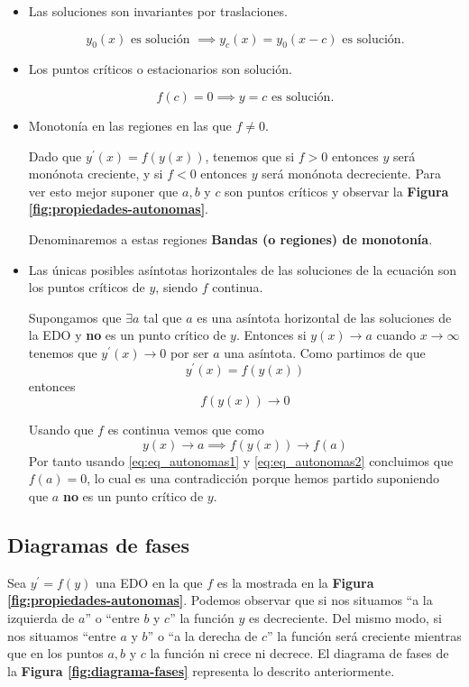 \documentclass{mathnotes}
\begin{document}

\begin{itemize}
\item Las soluciones son invariantes por traslaciones.

$$y_0(x) \text{ es solución } \implies y_c(x) = y_0(x-c) \text{ es solución.}$$

\item Los puntos críticos o estacionarios son solución.

$$f(c) = 0 \implies y=c \text{ es solución.}$$

\item Monotonía en las regiones en las que $f\neq 0$.

Dado que $y^\prime(x) = f(y(x))$, tenemos que si $f\gt0$ entonces $y$ será monónota creciente, y si $f\lt0$ entonces $y$ será monónota decreciente. Para ver esto mejor suponer que $a,b$ y $c$ son puntos críticos y observar la \textbf{Figura \ref{fig:propiedades-autonomas}}.

Denominaremos a estas regiones \textbf{Bandas (o regiones) de monotonía}.

\item Las únicas posibles asíntotas horizontales de las soluciones de la ecuación son los puntos críticos de $y$, siendo $f$ continua.

Supongamos que $\exists a $ tal que $a$ es una asíntota horizontal de las soluciones de la EDO y \textbf{no} es un punto crítico de $y$. Entonces si $y(x)\to a$ cuando $x\to \infty$ tenemos que $y^\prime(x)\to 0$ por ser $a$ una asíntota. Como partimos de que $$y^\prime(x) = f(y(x))$$ entonces
\begin{equation}
f(y(x))\to 0
\label{eq:eq_autonomas1}
\end{equation}

Usando que $f$ es continua vemos que como 
\begin{equation}
y(x)\to a \implies f(y(x))\to f(a)
\label{eq:eq_autonomas2}
\end{equation}
Por tanto usando \ref{eq:eq_autonomas1} y \ref{eq:eq_autonomas2} concluimos que $f(a) = 0$, lo cual es una contradicción porque hemos partido suponiendo que $a$ \textbf{no} es un punto crítico de $y$.
\end{itemize}

\subsection{Diagramas de fases}
Sea $y^\prime = f(y)$ una EDO en la que $f$ es la mostrada en la \textbf{Figura \ref{fig:propiedades-autonomas}}. Podemos observar que si nos situamos ``a la izquierda de $a$'' o ``entre $b$ y $c$'' la función $y$ es decreciente. Del mismo modo, si nos situamos ``entre $a$ y $b$'' o ``a la derecha de $c$'' la función será creciente mientras que en los puntos $a, b$ y $c$ la función ni crece ni decrece. El diagrama de fases de la \textbf{Figura \ref{fig:diagrama-fases}} representa lo descrito anteriormente. 
\end{document}
